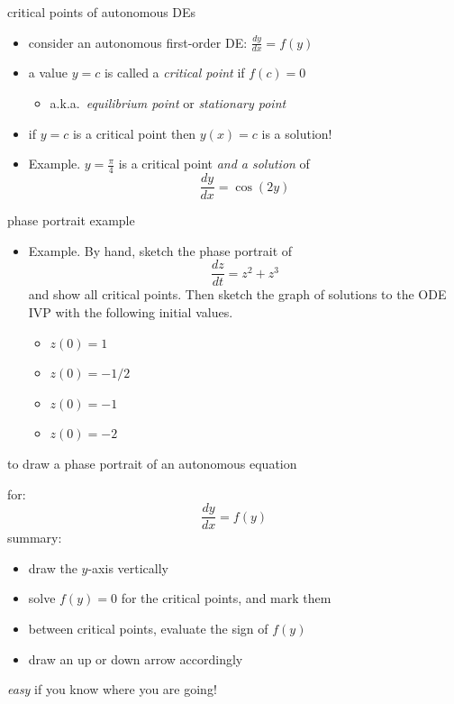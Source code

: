 \documentclass[colorlinks]{beamer}
\begin{document}
\begin{frame}{critical points of autonomous DEs}

\begin{itemize}
\item consider an autonomous first-order DE: \quad $\frac{dy}{dx} = f(y)$
\item a value $y=c$ is called a \emph{critical point} if $f(c)=0$
    \begin{itemize}
    \item a.k.a.~\emph{equilibrium point} or \emph{stationary point}
    \end{itemize}

\medskip
\item if $y=c$ is a critical point then $y(x)=c$ is a solution!

\medskip
\item Example.  $y=\frac{\pi}{4}$ is a critical point \emph{and a solution} of
    $$\frac{dy}{dx} = \cos(2y)$$

\vspace{5mm}
\end{itemize}
\end{frame}


\begin{frame}{phase portrait example}

\begin{itemize}
\small
\item \begin{minipage}[t]{0.4\textwidth}
Example.  By hand, sketch the phase portrait of
   $$\frac{dz}{dt} = z^2 + z^3$$
and show all critical points.  Then sketch the graph of solutions to the ODE IVP with the following initial values.
    \begin{itemize}
    \item[\color{black} \textbf{(a)}] $z(0)=1$
    \item[\color{black} \textbf{(b)}] $z(0)=-1/2$
    \item[\color{black} \textbf{(c)}] $z(0)=-1$
    \item[\color{black} \textbf{(c)}] $z(0)=-2$
    \end{itemize}
\end{minipage}
\end{itemize}
\end{frame}


\begin{frame}{to draw a phase portrait of an autonomous equation}

for:
    $$\frac{dy}{dx}=f(y)$$
summary:
\begin{itemize}
    \item draw the $y$-axis vertically
    \item solve $f(y)=0$ for the critical points, and mark them
    \item between critical points, evaluate the sign of $f(y)$
    \item draw an up or down arrow accordingly
\end{itemize}

\bigskip
\emph{easy} if you know where you are going!
\end{frame}
\end{document}
